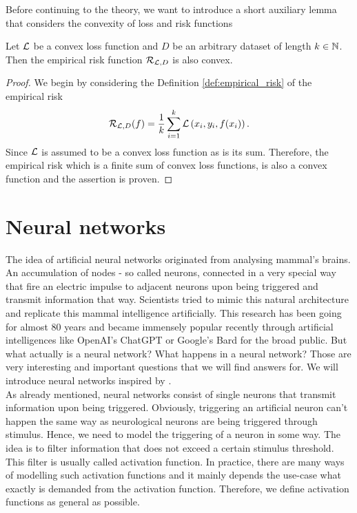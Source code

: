 Before continuing to the theory, we want to introduce a short auxiliary lemma that considers the convexity of loss and risk functions

\begin{lemma}\label{lemma:convex_risk}
Let $\operatorname{\mathcal{L}}$ be a convex loss function and $D$ be an arbitrary dataset of length $k\in\operatorname{\mathbb{N}}$.\\
Then the empirical risk function $\operatorname{\mathcal{R}}_{\operatorname{\mathcal{L}}, D}$ is also convex.
\end{lemma}

\begin{proof}
We begin by considering the Definition \ref{def:empirical_risk} of the empirical risk
\begin{align*}
\operatorname{\mathcal{R}}_{\operatorname{\mathcal{L}}, D} (f) = \frac{1}{k} \sum_{i=1}^{k} \operatorname{\mathcal{L}}\left(x_i, y_i, f(x_i)\right).
\end{align*}
Since $\operatorname{\mathcal{L}}$ is assumed to be a convex loss function as is its sum. Therefore, the empirical risk which is a finite sum of convex loss functions, is also a convex function and the assertion is proven.
\end{proof}


\section{Neural networks}\label{sec:nn}
The idea of artificial neural networks originated from analysing mammal's brains. An accumulation of nodes - so called neurons, connected in a very special way that fire an electric impulse to adjacent neurons upon being triggered and transmit information that way. Scientists tried to mimic this natural architecture and replicate this mammal intelligence artificially. This research has been going for almost 80 years and became immensely popular recently through artificial intelligences like OpenAI's ChatGPT or Google's Bard for the broad public. But what actually is a neural network? What happens in a neural network? Those are very interesting and important questions that we will find answers for. We will introduce neural networks inspired by \cite[Chapter~3]{mucke2019empirical}.\\
 As already mentioned, neural networks consist of single neurons that transmit information upon being \glqq triggered\grqq{}. Obviously, triggering an artificial neuron can't happen the same way as neurological neurons are being triggered through stimulus. Hence, we need to model the triggering of a neuron in some way. The idea is to filter information that does not exceed a certain stimulus threshold. This filter is usually called activation function. In practice, there are many ways of modelling such activation functions and it mainly depends the use-case what exactly is demanded from the activation function. Therefore, we define activation functions as general as possible.

